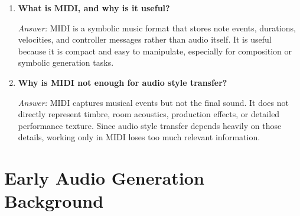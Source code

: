 \documentclass[11pt]{article}
\newcommand{\qa}[2]{
\item \textbf{#1}

\textit{Answer:} #2
}
\begin{document}
\begin{enumerate}[start=9]
\qa{What is MIDI, and why is it useful?}{
MIDI is a symbolic music format that stores note events, durations, velocities, and controller messages rather than audio itself. It is useful because it is compact and easy to manipulate, especially for composition or symbolic generation tasks.
}

\qa{Why is MIDI not enough for audio style transfer?}{
MIDI captures musical events but not the final sound. It does not directly represent timbre, room acoustics, production effects, or detailed performance texture. Since audio style transfer depends heavily on those details, working only in MIDI loses too much relevant information.
}
\end{enumerate}

\section{Early Audio Generation Background}
\end{document}
